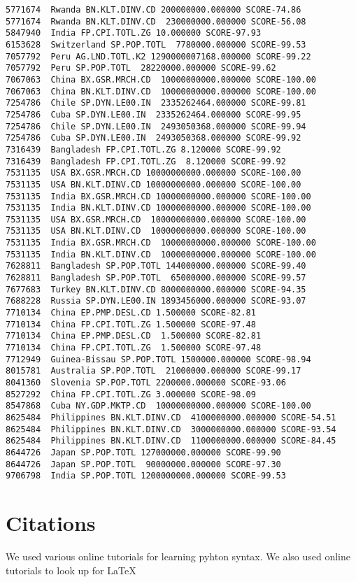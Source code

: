\documentclass{pracjourn}
\begin{document}
\begin{lstlisting}
5771674  Rwanda BN.KLT.DINV.CD 200000000.000000 SCORE-74.86
5771674  Rwanda BN.KLT.DINV.CD  230000000.000000 SCORE-56.08
5847940  India FP.CPI.TOTL.ZG 10.000000 SCORE-97.93
6153628  Switzerland SP.POP.TOTL  7780000.000000 SCORE-99.53
7057792  Peru AG.LND.TOTL.K2 1290000007168.000000 SCORE-99.22
7057792  Peru SP.POP.TOTL  28220000.000000 SCORE-99.62
7067063  China BX.GSR.MRCH.CD  10000000000.000000 SCORE-100.00
7067063  China BN.KLT.DINV.CD  10000000000.000000 SCORE-100.00
7254786  Chile SP.DYN.LE00.IN  2335262464.000000 SCORE-99.81
7254786  Cuba SP.DYN.LE00.IN  2335262464.000000 SCORE-99.95
7254786  Chile SP.DYN.LE00.IN  2493050368.000000 SCORE-99.94
7254786  Cuba SP.DYN.LE00.IN  2493050368.000000 SCORE-99.92
7316439  Bangladesh FP.CPI.TOTL.ZG 8.120000 SCORE-99.92
7316439  Bangladesh FP.CPI.TOTL.ZG  8.120000 SCORE-99.92
7531135  USA BX.GSR.MRCH.CD 10000000000.000000 SCORE-100.00
7531135  USA BN.KLT.DINV.CD 10000000000.000000 SCORE-100.00
7531135  India BX.GSR.MRCH.CD 10000000000.000000 SCORE-100.00
7531135  India BN.KLT.DINV.CD 10000000000.000000 SCORE-100.00
7531135  USA BX.GSR.MRCH.CD  10000000000.000000 SCORE-100.00
7531135  USA BN.KLT.DINV.CD  10000000000.000000 SCORE-100.00
7531135  India BX.GSR.MRCH.CD  10000000000.000000 SCORE-100.00
7531135  India BN.KLT.DINV.CD  10000000000.000000 SCORE-100.00
7628811  Bangladesh SP.POP.TOTL 144000000.000000 SCORE-99.40
7628811  Bangladesh SP.POP.TOTL  65000000.000000 SCORE-99.57
7677683  Turkey BN.KLT.DINV.CD 8000000000.000000 SCORE-94.35
7688228  Russia SP.DYN.LE00.IN 1893456000.000000 SCORE-93.07
7710134  China EP.PMP.DESL.CD 1.500000 SCORE-82.81
7710134  China FP.CPI.TOTL.ZG 1.500000 SCORE-97.48
7710134  China EP.PMP.DESL.CD  1.500000 SCORE-82.81
7710134  China FP.CPI.TOTL.ZG  1.500000 SCORE-97.48
7712949  Guinea-Bissau SP.POP.TOTL 1500000.000000 SCORE-98.94
8015781  Australia SP.POP.TOTL  21000000.000000 SCORE-99.17
8041360  Slovenia SP.POP.TOTL 2200000.000000 SCORE-93.06
8527292  China FP.CPI.TOTL.ZG 3.000000 SCORE-98.09
8547868  Cuba NY.GDP.MKTP.CD  10000000000.000000 SCORE-100.00
8625484  Philippines BN.KLT.DINV.CD  4100000000.000000 SCORE-54.51
8625484  Philippines BN.KLT.DINV.CD  3000000000.000000 SCORE-93.54
8625484  Philippines BN.KLT.DINV.CD  1100000000.000000 SCORE-84.45
8644726  Japan SP.POP.TOTL 127000000.000000 SCORE-99.90
8644726  Japan SP.POP.TOTL  90000000.000000 SCORE-97.30
9706798  India SP.POP.TOTL 1200000000.000000 SCORE-99.53
\end{lstlisting}

\section{Citations}
We used various online tutorials for learning pyhton syntax.
We also used online tutorials to look up for LaTeX
\end{document}
